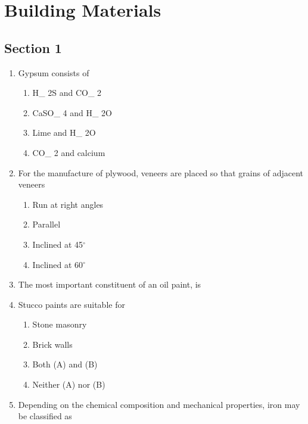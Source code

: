 \documentclass[11pt,a4paper]{article}
\begin{document}
\section{Building Materials}
\subsection*{Section 1}
\begin{enumerate}
\item{Gypsum consists of}
\begin{enumerate}[label=\Alph*.]
\item{H\_ 2S and CO\_ 2}
\item{CaSO\_ 4 and H\_ 2O}
\item{Lime and H\_ 2O}
\item{CO\_ 2 and calcium}
\end{enumerate}
\item{For the manufacture of plywood, veneers are placed so that grains of adjacent veneers}
\begin{enumerate}[label=\Alph*.]
\item{Run at right angles}
\item{Parallel}
\item{Inclined at 45$^\circ$}
\item{Inclined at 60$^\circ$}
\end{enumerate}
\item{The most important constituent of an oil paint, is}
\\
\item{Stucco paints are suitable for}
\begin{enumerate}[label=\Alph*.]
\item{Stone masonry}
\item{Brick walls}
\item{Both (A) and (B)}
\item{Neither (A) nor (B)}
\end{enumerate}
\item{Depending on the chemical composition and mechanical properties, iron may be classified as}
\\\begin{enumerate*}[itemjoin=\qquad, label=\Alph*.]

\end{enumerate*}
\end{enumerate}
\end{document}
